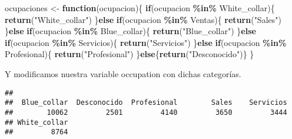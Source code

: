 \documentclass[]{article}
\newenvironment{Shaded}{\begin{snugshade}}{\end{snugshade}}
\newcommand{\ControlFlowTok}[1]{\textcolor[rgb]{0.13,0.29,0.53}{\textbf{#1}}}
\newcommand{\KeywordTok}[1]{\textcolor[rgb]{0.13,0.29,0.53}{\textbf{#1}}}
\newcommand{\NormalTok}[1]{#1}
\newcommand{\OperatorTok}[1]{\textcolor[rgb]{0.81,0.36,0.00}{\textbf{#1}}}
\newcommand{\StringTok}[1]{\textcolor[rgb]{0.31,0.60,0.02}{#1}}
\begin{document}
\begin{Shaded}
\begin{Highlighting}[]
\NormalTok{ocupaciones \textless{}{-}}\StringTok{ }\ControlFlowTok{function}\NormalTok{(ocupacion)\{}
  \ControlFlowTok{if}\NormalTok{(ocupacion }\OperatorTok{\%in\%}\StringTok{ }\NormalTok{White\_collar)\{}
    \KeywordTok{return}\NormalTok{(}\StringTok{"White\_collar"}\NormalTok{)}
\NormalTok{  \}}\ControlFlowTok{else} \ControlFlowTok{if}\NormalTok{(ocupacion }\OperatorTok{\%in\%}\StringTok{ }\NormalTok{Ventas)\{}
    \KeywordTok{return}\NormalTok{(}\StringTok{"Sales"}\NormalTok{)}
\NormalTok{  \}}\ControlFlowTok{else} \ControlFlowTok{if}\NormalTok{(ocupacion }\OperatorTok{\%in\%}\StringTok{ }\NormalTok{Blue\_collar)\{}
    \KeywordTok{return}\NormalTok{(}\StringTok{"Blue\_collar"}\NormalTok{)}
\NormalTok{  \}}\ControlFlowTok{else} \ControlFlowTok{if}\NormalTok{(ocupacion }\OperatorTok{\%in\%}\StringTok{ }\NormalTok{Servicios)\{}
    \KeywordTok{return}\NormalTok{(}\StringTok{"Servicios"}\NormalTok{)}
\NormalTok{  \}}\ControlFlowTok{else} \ControlFlowTok{if}\NormalTok{(ocupacion }\OperatorTok{\%in\%}\StringTok{ }\NormalTok{Profesional)\{}
    \KeywordTok{return}\NormalTok{(}\StringTok{"Profesional"}\NormalTok{)}
\NormalTok{  \}}\ControlFlowTok{else}\NormalTok{\{}\KeywordTok{return}\NormalTok{(}\StringTok{"Desconocido"}\NormalTok{)\}}
\NormalTok{\}}
\end{Highlighting}
\end{Shaded}

Y modificamos nuestra variable occupation con dichas categorías.

\begin{Shaded}
\end{Shaded}

\begin{Shaded}
\end{Shaded}

\begin{verbatim}
## 
##  Blue_collar  Desconocido  Profesional        Sales    Servicios 
##        10062         2501         4140         3650         3444 
## White_collar 
##         8764
\end{verbatim}
\end{document}
